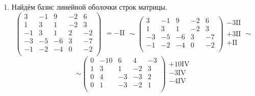 \begin{enumerate}
	\item Найдём базис линейной оболочки строк матрицы.
	      \[
		      \begin{pmatrix}
			      3  & -1 & 9  & -2 & 6  \\
			      1  & 3  & 1  & -2 & 3  \\
			      -1 & 3  & 1  & 2  & -2 \\
			      -3 & -5 & -6 & 3  & -7 \\
			      -1 & -2 & -4 & 0  & -2 \\
		      \end{pmatrix}
		      \begin{array}{c}
			      \\
			      \\
			      = -\text{II} \\
			      \\
			      \\
		      \end{array}
		      \sim
		      \begin{pmatrix}
			      3  & -1 & 9  & -2 & 6  \\
			      1  & 3  & 1  & -2 & 3  \\
			      -3 & -5 & -6 & 3  & -7 \\
			      -1 & -2 & -4 & 0  & -2 \\
		      \end{pmatrix}
		      \begin{array}{c}
			      -3 \text{II} \\
			      \\
			      +3 \text{II} \\
			      +\text{II}   \\
		      \end{array}
		      \sim
	      \]
	      \[
		      \sim
		      \begin{pmatrix}
			      0 & -10 & 6  & 4  & -3 \\
			      1 & 3   & 1  & -2 & 3  \\
			      0 & 4   & -3 & -3 & 2  \\
			      0 & 1   & -3 & -2 & 1  \\
		      \end{pmatrix}
		      \begin{array}{c}
			      +10 \text{IV} \\
			      -3 \text{IV}  \\
			      -4 \text{IV}  \\

\end{array}\]
\end{enumerate}
